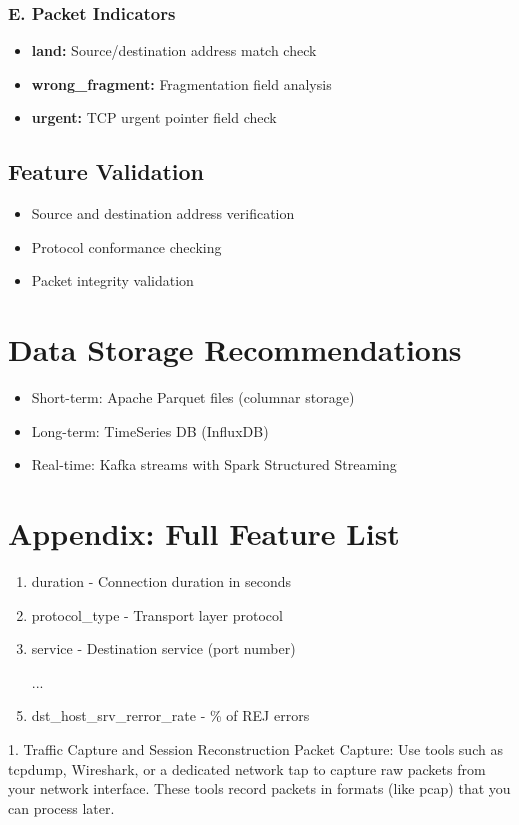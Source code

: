 \documentclass{article}
\begin{document}
\subsubsection{E. Packet Indicators}
\begin{itemize}
    \item \textbf{land:} Source/destination address match check
    \item \textbf{wrong\_fragment:} Fragmentation field analysis
    \item \textbf{urgent:} TCP urgent pointer field check
\end{itemize}

\subsection{Feature Validation}
\begin{itemize}
    \item Source and destination address verification
    \item Protocol conformance checking
    \item Packet integrity validation
\end{itemize}

\section{Data Storage Recommendations}
\begin{itemize}
    \item Short-term: Apache Parquet files (columnar storage)
    \item Long-term: TimeSeries DB (InfluxDB)
    \item Real-time: Kafka streams with Spark Structured Streaming
\end{itemize}

\section{Appendix: Full Feature List}
\begin{enumerate}
    \item duration - Connection duration in seconds
    \item protocol\_type - Transport layer protocol
    \item service - Destination service (port number)
    \item [...] %
    \item dst\_host\_srv\_rerror\_rate - \% of REJ errors
\end{enumerate}
1. Traffic Capture and Session Reconstruction
Packet Capture:
Use tools such as tcpdump, Wireshark, or a dedicated network tap to capture raw packets from your network interface. These tools record packets in formats (like pcap) that you can process later.
\end{document}
